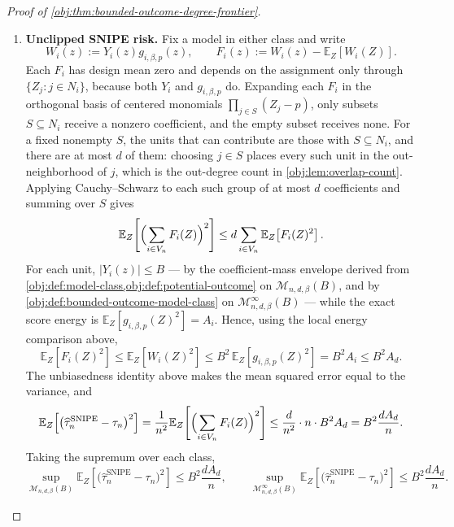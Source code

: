 \documentclass[11pt]{article}
\begin{document}
\begin{proof}[Proof of \cref{obj:thm:bounded-outcome-degree-frontier}]
\begin{enumerate}
\item \textbf{Unclipped SNIPE risk.}
Fix a model in either class and write
\[
W_i(z):=Y_i(z)g_{i,\beta,p}(z),
\qquad
F_i(z):=W_i(z)-\mathbb E_Z[W_i(Z)] .
\]
Each \(F_i\) has design mean zero and depends on the assignment only through
\(\{Z_j:j\in N_i\}\), because both \(Y_i\) and \(g_{i,\beta,p}\) do.  Expanding
each \(F_i\) in the orthogonal basis of centered monomials
\(\prod_{j\in S}(Z_j-p)\), only subsets \(S\subseteq N_i\) receive a nonzero
coefficient, and the empty subset receives none.  For a fixed nonempty \(S\), the
units that can contribute are those with \(S\subseteq N_i\), and there are at
most \(d\) of them: choosing \(j\in S\) places every such unit in the
out-neighborhood of \(j\), which is the out-degree count in
\cref{obj:lem:overlap-count}.  Applying Cauchy--Schwarz to each such group of at
most \(d\) coefficients and summing over \(S\) gives
\[
\mathbb E_Z\!\left[\Bigl(\sum_{i\in V_n}F_i(Z)\Bigr)^2\right]
\le
d\sum_{i\in V_n}\mathbb E_Z\!\left[F_i(Z)^2\right].
\]
For each unit, \(|Y_i(z)|\le B\) — by the coefficient-mass envelope derived from
\cref{obj:def:model-class,obj:def:potential-outcome} on
\(\mathcal M_{n,d,\beta}(B)\), and by
\cref{obj:def:bounded-outcome-model-class} on
\(\mathcal M_{n,d,\beta}^{\infty}(B)\) — while the exact score energy is
\(\mathbb E_Z[g_{i,\beta,p}(Z)^2]=A_i\).  Hence, using the local energy comparison above,
\[
\mathbb E_Z\!\left[F_i(Z)^2\right]
\le
\mathbb E_Z\!\left[W_i(Z)^2\right]
\le
B^2\,\mathbb E_Z\!\left[g_{i,\beta,p}(Z)^2\right]
=B^2A_i
\le B^2A_d .
\]
The unbiasedness identity above makes the mean squared error equal to the
variance, and
\[
\mathbb E_Z\!\left[
\bigl(\widehat\tau_n^{\mathrm{SNIPE}}-\tau_n\bigr)^2
\right]
=
\frac{1}{n^{2}}
\mathbb E_Z\!\left[\Bigl(\sum_{i\in V_n}F_i(Z)\Bigr)^2\right]
\le
\frac{d}{n^{2}}\cdot n\cdot B^2A_d
=
B^2\frac{dA_d}{n}.
\]
Taking the supremum over each class,
\[
\sup_{\mathcal M_{n,d,\beta}(B)}
\mathbb E_Z\!\left[
\bigl(\widehat\tau_n^{\mathrm{SNIPE}}-\tau_n\bigr)^2
\right]
\le
B^2\frac{dA_d}{n},
\qquad
\sup_{\mathcal M_{n,d,\beta}^{\infty}(B)}
\mathbb E_Z\!\left[
\bigl(\widehat\tau_n^{\mathrm{SNIPE}}-\tau_n\bigr)^2
\right]
\le
B^2\frac{dA_d}{n}.
\]


\end{enumerate}
\end{proof}
\end{document}

